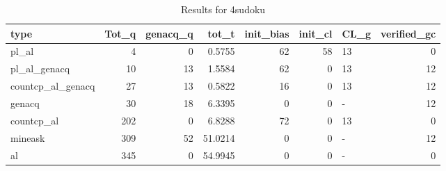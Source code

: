 \begin{table}[ht]
\caption{Results for 4sudoku}
\begin{tabular}{lrrrrrlr}
\hline
 type              &   Tot\_q &   genacq\_q &   tot\_t &   init\_bias &   init\_cl & CL\_g   &   verified\_gc \\
\hline
 pl\_al             &       4 &          0 &  0.5755 &          62 &        58 & 13     &             0 \\
 pl\_al\_genacq      &      10 &         13 &  1.5584 &          62 &         0 & 13     &            12 \\
 countcp\_al\_genacq &      27 &         13 &  0.5822 &          16 &         0 & 13     &            12 \\
 genacq            &      30 &         18 &  6.3395 &           0 &         0 & -      &            12 \\
 countcp\_al        &     202 &          0 &  6.8288 &          72 &         0 & 13     &             0 \\
 mineask           &     309 &         52 & 51.0214 &           0 &         0 & -      &            12 \\
 al                &     345 &          0 & 54.9945 &           0 &         0 & -      &             0 \\
\hline
\end{tabular}
\end{table}